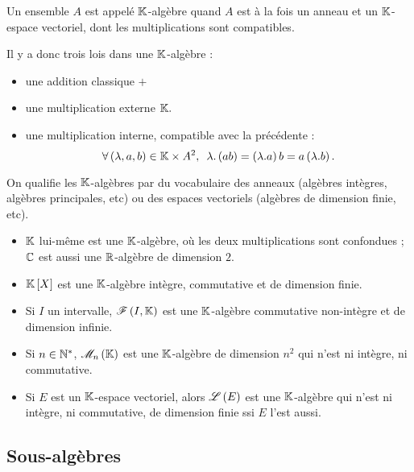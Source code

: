 \begin{defi}
Un ensemble \(A\) est appelé \(\mathbb{K}\)-algèbre quand \(A\) est à la fois un anneau et un \(\mathbb{K}\)-espace vectoriel, dont les multiplications sont compatibles.

Il y a donc trois lois dans une \(\mathbb{K}\)-algèbre :

\begin{itemize}
    \item une addition classique \(+\) \\
    \item une multiplication externe \(\mathbb{K}.\) \\
    \item une multiplication interne, compatible avec la précédente : \[\quantifs{\forall\paren{\lambda,a,b}\in\K\times A^2}\lambda.\paren{ab}=\paren{\lambda.a}b=a\paren{\lambda.b}.\]
\end{itemize}
\end{defi}

On qualifie les \(\mathbb{K}\)-algèbres par du vocabulaire des anneaux (algèbres intègres, algèbres principales, etc) ou des espaces vectoriels (algèbres de dimension finie, etc).

\begin{ex}
\begin{itemize}
    \item \(\mathbb{K}\) lui-même est une \(\mathbb{K}\)-algèbre, où les deux multiplications sont confondues ; \(\mathbb{C}\) est aussi une \(\mathbb{R}\)-algèbre de dimension \(2\). \\
    \item \(\poly\) est une \(\mathbb{K}\)-algèbre intègre, commutative et de dimension finie. \\
    \item Si \(I\) un intervalle, \(\mathscr{F}\left(I,\mathbb{K}\right)\) est une \(\mathbb{K}\)-algèbre commutative non-intègre et de dimension infinie. \\
    \item Si \(n\in\mathbb{N}^*\), \(\M{n}\) est une \(\mathbb{K}\)-algèbre de dimension \(n^2\) qui n'est ni intègre, ni commutative. \\
    \item Si \(E\) est un \(\mathbb{K}\)-espace vectoriel, alors \(\mathscr{L}\left(E\right)\) est une \(\mathbb{K}\)-algèbre qui n'est ni intègre, ni commutative, de dimension finie ssi \(E\) l'est aussi.
\end{itemize}
\end{ex}

\subsection{Sous-algèbres}

